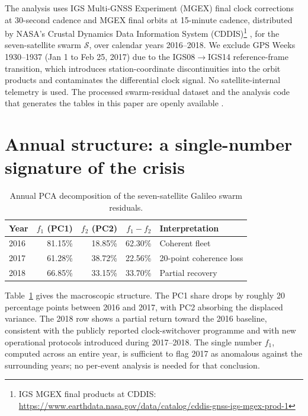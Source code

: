 \documentclass[11pt,a4paper]{article}
\begin{document}
The analysis uses IGS Multi-GNSS Experiment (MGEX) final clock corrections at 30-second cadence and MGEX final orbits at 15-minute cadence, distributed by NASA's Crustal Dynamics Data Information System (CDDIS)\footnote{IGS MGEX final products at CDDIS: \url{https://www.earthdata.nasa.gov/data/catalog/cddis-gnss-igs-mgex-prod-1}} \citep{CDDIS_MGEX, Noll2010}, for the seven-satellite swarm $\mathcal{S}$, over calendar years 2016--2018. We exclude GPS Weeks 1930--1937 (Jan 1 to Feb 25, 2017) due to the IGS08$\to$IGS14 reference-frame transition, which introduces station-coordinate discontinuities into the orbit products and contaminates the differential clock signal. No satellite-internal telemetry is used. The processed swarm-residual dataset and the analysis code that generates the tables in this paper are openly available \citep{HansenData2026, HansenCode2026}.

\section{Annual structure: a single-number signature of the crisis}

\begin{table}[h]
    \centering
    \caption{Annual PCA decomposition of the seven-satellite Galileo swarm residuals.}
    \label{tab:annual}
    \begin{tabular}{lrrrl}
        \toprule
        Year & $f_1$ (PC1) & $f_2$ (PC2) & $f_1 - f_2$ & Interpretation \\
        \midrule
        2016 & 81.15\% & 18.85\% & 62.30\% & Coherent fleet \\
        2017 & 61.28\% & 38.72\% & 22.56\% & 20-point coherence loss \\
        2018 & 66.85\% & 33.15\% & 33.70\% & Partial recovery \\
        \bottomrule
    \end{tabular}
\end{table}

Table~\ref{tab:annual} gives the macroscopic structure. The PC1 share drops by roughly 20 percentage points between 2016 and 2017, with PC2 absorbing the displaced variance. The 2018 row shows a partial return toward the 2016 baseline, consistent with the publicly reported clock-switchover programme and with new operational protocols introduced during 2017--2018. The single number $f_1$, computed across an entire year, is sufficient to flag 2017 as anomalous against the surrounding years; no per-event analysis is needed for that conclusion.
\end{document}

